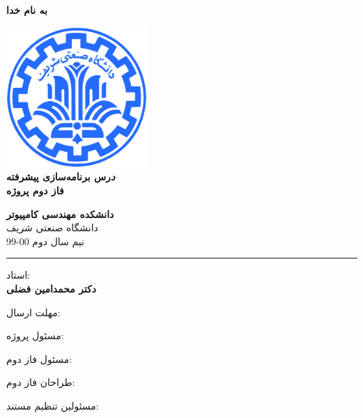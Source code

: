 \documentclass[]{article}
\begin{document}
\begin{titlepage}
\begin{center}

\textbf{ \Huge{به نام خدا} }
        
\vspace{0.2cm}

\includegraphics[width=0.4\textwidth]{sharif1.png}\\
\vspace{0.2cm}
\textbf{ \Huge{\emph درس برنامه‌سازی پیشرفته} }\\
\vspace{0.25cm}
\textbf{ \Large{ فاز دوم پروژه} }
\vspace{0.2cm}
       
 
      \large \textbf{دانشکده مهندسی کامپیوتر}\\\vspace{0.1cm}
    \large   دانشگاه صنعتی شریف\\\vspace{0.2cm}
       \large   ﻧﯿﻢ سال دوم 00-99 \\\vspace{0.10cm}
      \noindent\rule[1ex]{\linewidth}{1pt}
استاد:\\
    \textbf{{دکتر محمدامین فضلی}}



    \vspace{0.20cm}

   مهلت ارسال:\\
    \textbf{{}}
    \textbf{{}}

    \vspace{0.10cm}
مسئول پروژه:\\
    \textbf{}
    
        \vspace{0.10cm}
مسئول فاز دوم:\\
    \textbf{}
    
        \vspace{0.10cm}
طراحان فاز دوم:\\
    \textbf{\authorFont{}}
    
        \vspace{0.05cm}
مسئولین تنظیم مستند:\\
    \textbf{}
    

\end{center}
\end{titlepage}
\end{document}
